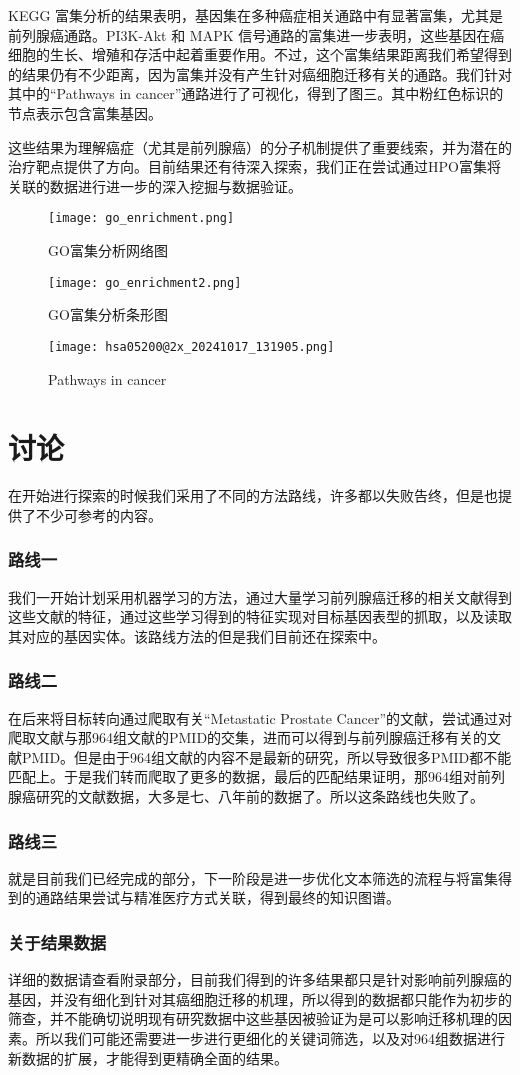 \documentclass{article}
\begin{document}
KEGG 富集分析的结果表明，基因集在多种癌症相关通路中有显著富集，尤其是前列腺癌通路。PI3K-Akt 和 MAPK 信号通路的富集进一步表明，这些基因在癌细胞的生长、增殖和存活中起着重要作用。不过，这个富集结果距离我们希望得到的结果仍有不少距离，因为富集并没有产生针对癌细胞迁移有关的通路。我们针对其中的“Pathways in cancer”通路进行了可视化，得到了图三。其中粉红色标识的节点表示包含富集基因。

这些结果为理解癌症（尤其是前列腺癌）的分子机制提供了重要线索，并为潜在的治疗靶点提供了方向。目前结果还有待深入探索，我们正在尝试通过HPO富集将关联的数据进行进一步的深入挖掘与数据验证。

\begin{figure}[h]
\texttt{[image: go\_enrichment.png]} %
\caption{GO富集分析网络图}
\texttt{[image: go\_enrichment2.png]} %
\caption{GO富集分析条形图}
\end{figure}

\begin{figure}[h]
\texttt{[image: hsa05200@2x\_20241017\_131905.png]} %
\caption{Pathways in cancer}
\end{figure}
\section*{讨论}
在开始进行探索的时候我们采用了不同的方法路线，许多都以失败告终，但是也提供了不少可参考的内容。

\subsubsection*{路线一}
我们一开始计划采用机器学习的方法，通过大量学习前列腺癌迁移的相关文献得到这些文献的特征，通过这些学习得到的特征实现对目标基因表型的抓取，以及读取其对应的基因实体。该路线方法的但是我们目前还在探索中。

\subsubsection*{路线二}
在后来将目标转向通过爬取有关“Metastatic Prostate Cancer”的文献，尝试通过对爬取文献与那964组文献的PMID的交集，进而可以得到与前列腺癌迁移有关的文献PMID。但是由于964组文献的内容不是最新的研究，所以导致很多PMID都不能匹配上。于是我们转而爬取了更多的数据，最后的匹配结果证明，那964组对前列腺癌研究的文献数据，大多是七、八年前的数据了。所以这条路线也失败了。

\subsubsection*{路线三}
就是目前我们已经完成的部分，下一阶段是进一步优化文本筛选的流程与将富集得到的通路结果尝试与精准医疗方式关联，得到最终的知识图谱。

\subsubsection*{关于结果数据}
详细的数据请查看附录部分，目前我们得到的许多结果都只是针对影响前列腺癌的基因，并没有细化到针对其癌细胞迁移的机理，所以得到的数据都只能作为初步的筛查，并不能确切说明现有研究数据中这些基因被验证为是可以影响迁移机理的因素。所以我们可能还需要进一步进行更细化的关键词筛选，以及对964组数据进行新数据的扩展，才能得到更精确全面的结果。
\end{document}
